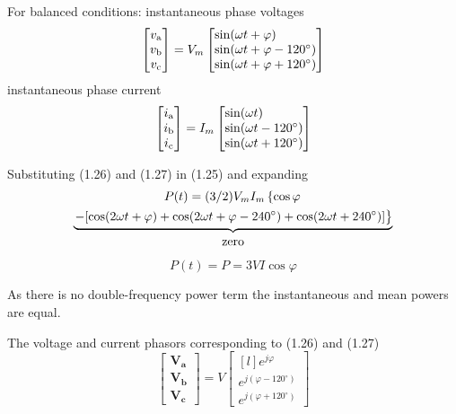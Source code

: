\documentclass[a4paper,numbers=noenddot,12pt]{scrbook}
\begin{document}
For balanced conditions: instantaneous phase voltages
\begin{equation}
    \begin{bmatrix}
        v_\textup{a} \\ v_\textup{b} \\ v_\textup{c}
    \end{bmatrix}
    = V_m
    \begin{bmatrix*}[l]
        \sin(\omega t + \varphi) \\
        \sin(\omega t + \varphi - 120^\circ )\\
        \sin(\omega t + \varphi + 120^\circ )
    \end{bmatrix*}
    \label{eq:Eq1.26}
\end{equation}
instantaneous phase current
\begin{equation}
    \begin{bmatrix}
        i_\textup{a} \\ i_\textup{b} \\ i_\textup{c}
    \end{bmatrix}
    = I_m
    \begin{bmatrix*}[l]
        \sin(\omega t ) \\
        \sin(\omega t - 120^\circ )\\
        \sin(\omega t + 120^\circ )
    \end{bmatrix*}
    \label{eq:Eq1.27}
\end{equation}

Substituting (1.26) and (1.27) in (1.25) and expanding
\begin{multline*}
    P(t) = (3/2) V_m I_m \left\{\cos \varphi \right. \\
        \underbrace{\left.-[\cos (2 \omega t + \varphi) + \cos (2\omega t + \varphi - 240^\circ) + \cos (2 \omega t +240^\circ)]\right\}}_{%
            \begin{gathered}
                \text{zero}
            \end{gathered}}
\end{multline*}
\begin{equation}
    P(t) = P = 3 V I \cos \varphi
    \label{eq:Eq1.28}
\end{equation}

As there is no double-frequency power term the instantaneous and mean powers are equal.

The voltage and current phasors corresponding to (1.26) and (1.27)
\begin{equation}
    \begin{bmatrix}
       \mathbf{V_a} \\ \mathbf{V_b} \\ \mathbf{V_c}
    \end{bmatrix}
    = V
    \begin{bmatrix*}[l]
        e^{j \varphi} \\ e^{j (\varphi - 120^\circ)} \\ e^{j (\varphi + 120^\circ)}
    \end{bmatrix*}
    \label{eq:Eq1.29}
\end{equation}
\end{document}
